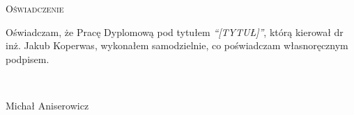 \newpage
\thispagestyle{empty}


\begin{center}
 \LARGE\textsc{Oświadczenie}
\end{center}

\vspace{1cm}

Oświadczam, że Pracę Dyplomową pod tytułem \emph{``[TYTUŁ]''}, którą kierował dr inż. Jakub Koperwas, wykonałem samodzielnie, co poświadczam własnoręcznym podpisem.

\vspace{2cm}

\begin{flushright}
\begin{minipage}{5cm}
 \dotfill \\[-0.7cm]
 \begin{center}
  \small Michał Aniserowicz
 \end{center}
\end{minipage}
\end{flushright}

